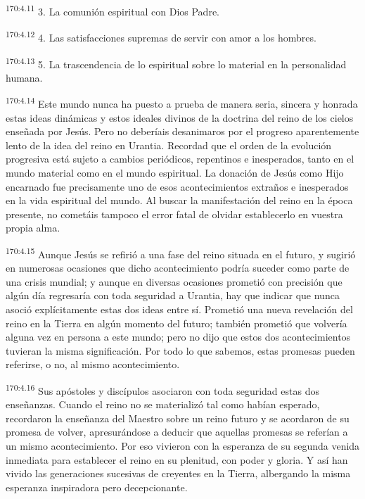 \par 
\textsuperscript{170:4.11} 3. La comunión espiritual con Dios Padre.

\par 
\textsuperscript{170:4.12} 4. Las satisfacciones supremas de servir con amor a los hombres.

\par 
\textsuperscript{170:4.13} 5. La trascendencia de lo espiritual sobre lo material en la personalidad humana.

\par 
\textsuperscript{170:4.14} Este mundo nunca ha puesto a prueba de manera seria, sincera y honrada estas ideas dinámicas y estos ideales divinos de la doctrina del reino de los cielos enseñada por Jesús. Pero no deberíais desanimaros por el progreso aparentemente lento de la idea del reino en Urantia. Recordad que el orden de la evolución progresiva está sujeto a cambios periódicos, repentinos e inesperados, tanto en el mundo material como en el mundo espiritual. La donación de Jesús como Hijo encarnado fue precisamente uno de esos acontecimientos extraños e inesperados en la vida espiritual del mundo. Al buscar la manifestación del reino en la época presente, no cometáis tampoco el error fatal de olvidar establecerlo en vuestra propia alma.

\par 
\textsuperscript{170:4.15} Aunque Jesús se refirió a una fase del reino situada en el futuro, y sugirió en numerosas ocasiones que dicho acontecimiento podría suceder como parte de una crisis mundial; y aunque en diversas ocasiones prometió con precisión que algún día regresaría con toda seguridad a Urantia, hay que indicar que nunca asoció explícitamente estas dos ideas entre sí. Prometió una nueva revelación del reino en la Tierra en algún momento del futuro; también prometió que volvería alguna vez en persona a este mundo; pero no dijo que estos dos acontecimientos tuvieran la misma significación. Por todo lo que sabemos, estas promesas pueden referirse, o no, al mismo acontecimiento.

\par 
\textsuperscript{170:4.16} Sus apóstoles y discípulos asociaron con toda seguridad estas dos enseñanzas. Cuando el reino no se materializó tal como habían esperado, recordaron la enseñanza del Maestro sobre un reino futuro y se acordaron de su promesa de volver, apresurándose a deducir que aquellas promesas se referían a un mismo acontecimiento. Por eso vivieron con la esperanza de su segunda venida inmediata para establecer el reino en su plenitud, con poder y gloria. Y así han vivido las generaciones sucesivas de creyentes en la Tierra, albergando la misma esperanza inspiradora pero decepcionante.

